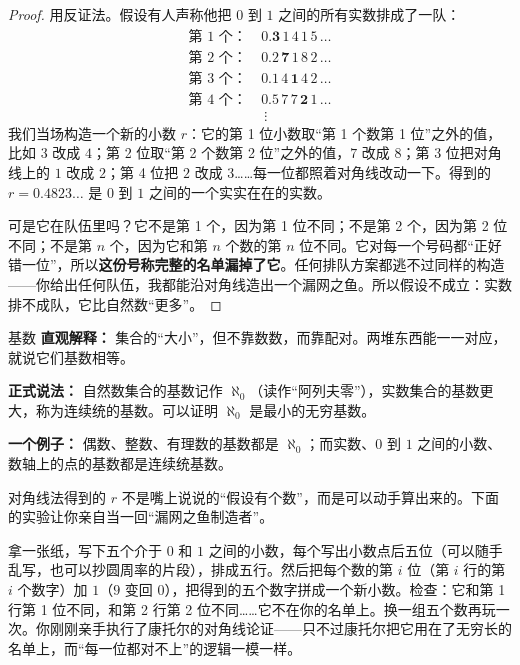 \begin{proof}
用反证法。假设有人声称他把 $0$ 到 $1$ 之间的所有实数排成了一队：
\begin{align*}
\text{第 1 个：}\ & 0.\mathbf{3}\,1\,4\,1\,5\,\ldots\\
\text{第 2 个：}\ & 0.2\,\mathbf{7}\,1\,8\,2\,\ldots\\
\text{第 3 个：}\ & 0.1\,4\,\mathbf{1}\,4\,2\,\ldots\\
\text{第 4 个：}\ & 0.5\,7\,7\,\mathbf{2}\,1\,\ldots\\
& \ \vdots
\end{align*}
我们当场构造一个新的小数 $r$：它的第 1 位小数取“第 1 个数第 1 位”之外的值，比如 $3$ 改成 $4$；第 2 位取“第 2 个数第 2 位”之外的值，$7$ 改成 $8$；第 3 位把对角线上的 $1$ 改成 $2$；第 4 位把 $2$ 改成 $3$……每一位都照着对角线改动一下。得到的 $r = 0.4823\ldots$ 是 $0$ 到 $1$ 之间的一个实实在在的实数。

可是它在队伍里吗？它不是第 1 个，因为第 1 位不同；不是第 2 个，因为第 2 位不同；不是第 $n$ 个，因为它和第 $n$ 个数的第 $n$ 位不同。它对每一个号码都“正好错一位”，所以\textbf{这份号称完整的名单漏掉了它}。任何排队方案都逃不过同样的构造——你给出任何队伍，我都能沿对角线造出一个漏网之鱼。所以假设不成立：实数排不成队，它比自然数“更多”。
\end{proof}

\begin{shuyu}{基数}
\textbf{直观解释：} 集合的“大小”，但不靠数数，而靠配对。两堆东西能一一对应，就说它们基数相等。

\textbf{正式说法：} 自然数集合的基数记作 $\aleph_0$（读作“阿列夫零”），实数集合的基数更大，称为连续统的基数。可以证明 $\aleph_0$ 是最小的无穷基数。

\textbf{一个例子：} 偶数、整数、有理数的基数都是 $\aleph_0$；而实数、$0$ 到 $1$ 之间的小数、数轴上的点的基数都是连续统基数。
\end{shuyu}

对角线法得到的 $r$ 不是嘴上说说的“假设有个数”，而是可以动手算出来的。下面的实验让你亲自当一回“漏网之鱼制造者”。

\begin{shiyan}
拿一张纸，写下五个介于 $0$ 和 $1$ 之间的小数，每个写出小数点后五位（可以随手乱写，也可以抄圆周率的片段），排成五行。然后把每个数的第 $i$ 位（第 $i$ 行的第 $i$ 个数字）加 $1$（$9$ 变回 $0$），把得到的五个数字拼成一个新小数。检查：它和第 1 行第 1 位不同，和第 2 行第 2 位不同……它不在你的名单上。换一组五个数再玩一次。你刚刚亲手执行了康托尔的对角线论证——只不过康托尔把它用在了无穷长的名单上，而“每一位都对不上”的逻辑一模一样。
\end{shiyan}


